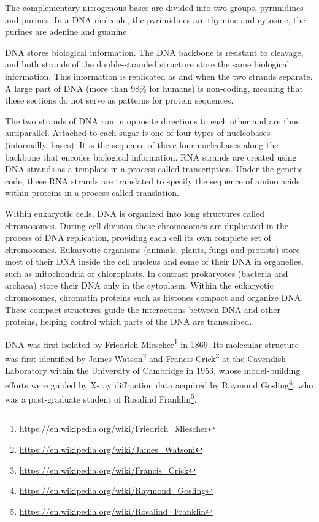 \documentclass[]{book}
\let\rmarkdownfootnote\footnote%
\def\footnote{\protect\rmarkdownfootnote}
\renewcommand{\href}[2]{#2\footnote{\url{#1}}}
\theoremstyle{definition}
\theoremstyle{definition}
\theoremstyle{definition}
\theoremstyle{remark}
\begin{document}
The complementary nitrogenous bases are divided into two groups,
pyrimidines and purines. In a DNA molecule, the pyrimidines are thymine
and cytosine, the purines are adenine and guanine.

DNA stores biological information. The DNA backbone is resistant to
cleavage, and both strands of the double-stranded structure store the
same biological information. This information is replicated as and when
the two strands separate. A large part of DNA (more than 98\% for
humans) is non-coding, meaning that these sections do not serve as
patterns for protein sequences.

The two strands of DNA run in opposite directions to each other and are
thus antiparallel. Attached to each sugar is one of four types of
nucleobases (informally, bases). It is the sequence of these four
nucleobases along the backbone that encodes biological information. RNA
strands are created using DNA strands as a template in a process called
transcription. Under the genetic code, these RNA strands are translated
to specify the sequence of amino acids within proteins in a process
called translation.

Within eukaryotic cells, DNA is organized into long structures called
chromosomes. During cell division these chromosomes are duplicated in
the process of DNA replication, providing each cell its own complete set
of chromosomes. Eukaryotic organisms (animals, plants, fungi and
protists) store most of their DNA inside the cell nucleus and some of
their DNA in organelles, such as mitochondria or chloroplasts. In
contrast prokaryotes (bacteria and archaea) store their DNA only in the
cytoplasm. Within the eukaryotic chromosomes, chromatin proteins such as
histones compact and organize DNA. These compact structures guide the
interactions between DNA and other proteins, helping control which parts
of the DNA are transcribed.

DNA was first isolated by
\href{https://en.wikipedia.org/wiki/Friedrich_Miescher}{Friedrich
Miescher} in 1869. Its molecular structure was first identified by
\href{https://en.wikipedia.org/wiki/James_Watsoni}{James Watson} and
\href{https://en.wikipedia.org/wiki/Francis_Crick}{Francis Crick} at the
Cavendish Laboratory within the University of Cambridge in 1953, whose
model-building efforts were guided by X-ray diffraction data acquired by
\href{https://en.wikipedia.org/wiki/Raymond_Gosling}{Raymond Gosling},
who was a post-graduate student of
\href{https://en.wikipedia.org/wiki/Rosalind_Franklin}{Rosalind
Franklin}.
\end{document}
